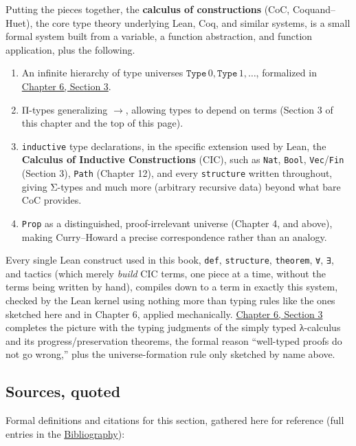 Putting the pieces together, the \textbf{calculus of constructions} (CoC, Coquand--Huet), the core type theory underlying Lean, Coq, and similar systems, is a small formal system built from a variable, a function abstraction, and function application, plus the following.

\begin{enumerate}
\def\labelenumi{\arabic{enumi}.}
\tightlist
\item
  An infinite hierarchy of type universes \(\mathtt{Type}\,0,
  \mathtt{Type}\,1, \ldots\), formalized in \hyperref[sec:06-rigor-check:03-typing-rules-and-safety:1]{Chapter 6, Section 3}.
\item
  Π-types generalizing \(\to\), allowing types to depend on terms (Section 3 of this chapter and the top of this page).
\item
  \texttt{inductive} type declarations, in the specific extension used by Lean, the \textbf{Calculus of Inductive Constructions} (CIC), such as \texttt{Nat}, \texttt{Bool}, \texttt{Vec}/\texttt{Fin} (Section 3), \texttt{Path} (Chapter 12), and every \texttt{structure} written throughout, giving Σ-types and much more (arbitrary recursive data) beyond what bare CoC provides.
\item
  \texttt{Prop} as a distinguished, proof-irrelevant universe (Chapter 4, and above), making Curry--Howard a precise correspondence rather than an analogy.
\end{enumerate}

Every single Lean construct used in this book, \texttt{def}, \texttt{structure}, \texttt{theorem}, \texttt{∀}, \texttt{∃}, and tactics (which merely \emph{build} CIC terms, one piece at a time, without the terms being written by hand), compiles down to a term in exactly this system, checked by the Lean kernel using nothing more than typing rules like the ones sketched here and in Chapter 6, applied mechanically. \hyperref[sec:06-rigor-check:03-typing-rules-and-safety:1]{Chapter 6, Section 3} completes the picture with the typing judgments of the simply typed λ-calculus and its progress/preservation theorems, the formal reason ``well-typed proofs do not go wrong,'' plus the universe-formation rule only sketched by name above.

\subsection{Sources, quoted}\label{sec:02-terminology-and-coc:02-pi-sigma-and-coc:8}

Formal definitions and citations for this section, gathered here for reference (full entries in the \hyperref[sec:root:bibliography:1]{Bibliography}):

